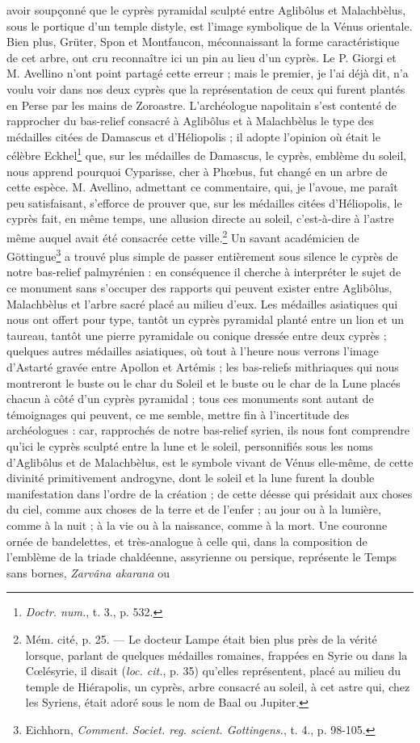 \documentclass[a4paper, 11pt, oneside, polutonikogreek, french]{article}
\begin{document}
avoir soupçonné que le cyprès pyramidal sculpté entre Aglibôlus et Malachbèlus, sous le portique d'un temple distyle, est l'image symbolique de la Vénus orientale. Bien plus, Grüter, Spon et Montfaucon, méconnaissant la forme caractéristique de cet arbre, ont cru reconnaître ici un pin au lieu d'un cyprès. Le P. Giorgi et M. Avellino n'ont point partagé cette erreur ; mais le premier, je l'ai déjà dit, n'a voulu voir dans nos deux cyprès que la représentation de ceux qui furent plantés en Perse par les mains de Zoroastre. L'archéologue napolitain s'est contenté de rapprocher du bas-relief consacré à Aglibôlus et à Malachbèlus le type des médailles citées de Damascus et d'Héliopolis ; il adopte l'opinion où était le célèbre Eckhel\footnote{\emph{Doctr. num.}, t. 3., p. 532.} que, sur les médailles de Damascus, le cyprès, emblème du soleil, nous apprend pourquoi Cyparisse, cher à Phœbus, fut changé en un arbre de cette espèce. M. Avellino, admettant ce commentaire, qui, je l'avoue, me paraît peu satisfaisant, s'efforce de prouver que, sur les médailles citées d'Héliopolis, le cyprès fait, en même temps, une allusion directe au soleil, c'est-à-dire à l'astre même auquel avait été consacrée cette ville.\footnote{Mém. cité, p. 25. --- Le docteur Lampe était bien plus près de la vérité lorsque, parlant de quelques médailles romaines, frappées en Syrie ou dans la Cœlésyrie, il disait (\emph{loc. cit.}, p. 35) qu'elles représentent, placé au milieu du temple de Hiérapolis, un cyprès, arbre consacré au soleil, à cet astre qui, chez les Syriens, était adoré sous le nom de Baal ou Jupiter.} Un savant académicien de Göttingue\footnote{Eichhorn, \emph{Comment. Societ. reg. scient. Gottingens.}, t. 4., p. 98-105.} a trouvé plus simple de passer entièrement sous silence le cyprès de notre bas-relief palmyrénien : en conséquence il cherche à interpréter le sujet de ce monument sans s'occuper des rapports qui peuvent exister entre Aglibôlus, Malachbèlus et l'arbre sacré placé au milieu d'eux. Les médailles asiatiques qui nous ont offert pour type, tantôt un cyprès pyramidal planté entre un lion et un taureau, tantôt une pierre pyramidale ou conique dressée entre deux cyprès ; quelques autres médailles asiatiques, où tout à l'heure nous verrons l'image d'Astarté gravée entre Apollon et Artémis ; les bas-reliefs mithriaques qui nous montreront le buste ou le char du Soleil et le buste ou le char de la Lune placés chacun à côté d'un cyprès pyramidal ; tous ces monuments sont autant de témoignages qui peuvent, ce me semble, mettre fin à l'incertitude des archéologues : car, rapprochés de notre bas-relief syrien, ils nous font comprendre qu'ici le cyprès sculpté entre la lune et le soleil, personnifiés sous les noms d'Aglibôlus et de Malachbèlus, est le symbole vivant de Vénus elle-même, de cette divinité primitivement androgyne, dont le soleil et la lune furent la double manifestation dans l'ordre de la création ; de cette déesse qui présidait aux choses du ciel, comme aux choses de la terre et de l'enfer ; au jour ou à la lumière, comme à la nuit ; à la vie ou à la naissance, comme à la mort. Une couronne ornée de bandelettes, et très-analogue à celle qui, dans la composition de l'emblème de la triade chaldéenne, assyrienne ou persique, représente le Temps sans bornes, \emph{Zarvâna akarana} ou 
\end{document}
